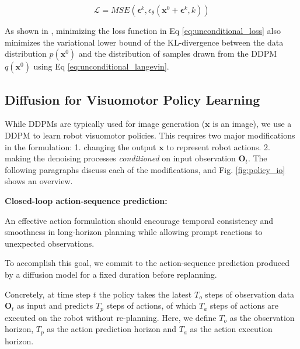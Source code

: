 \vspace{-2mm}
\begin{equation}
    \mathcal{L} = MSE(\mathbf{\epsilon}^k, \epsilon_\theta(\mathbf{x}^0+\mathbf{\epsilon}^k,k))
    \label{eq:unconditional_loss}
\end{equation}

As shown in \cite{ho2020denoising}, minimizing the loss function in Eq \ref{eq:unconditional_loss} also minimizes the variational lower bound of the KL-divergence between the data distribution $p(\mathbf{x}^0)$ and the distribution of samples drawn from the DDPM $q(\mathbf{x}^0)$ using Eq \ref{eq:unconditional_langevin}.






























\subsection{Diffusion for Visuomotor Policy Learning} 

While DDPMs are typically used for image generation ($\mathbf{x}$ is an image), we use a DDPM to learn robot visuomotor policies. This requires two major modifications in the formulation: 
1. changing the output $\mathbf{x}$  to represent robot actions.  
2. making the denoising processes \textit{conditioned} on input observation $\mathbf{O}_t$. 
The following paragraphs discuss each of the modifications, and Fig. \ref{fig:policy_io} shows an overview. 

\textbf{Closed-loop action-sequence prediction:}

An effective action formulation should encourage temporal consistency and smoothness in long-horizon planning while allowing prompt reactions to unexpected observations. 


To accomplish this goal, we commit to the action-sequence prediction produced by a diffusion model for a fixed duration before replanning. 

Concretely, at time step $t$ the policy takes the latest $T_o$ steps of observation data $\mathbf{O}_t$ as input and predicts $T_p$ steps of actions, of which $T_a$ steps of actions are executed on the robot without re-planning. Here, we define $T_o$ as the observation horizon, $T_p$ as the action prediction horizon and $T_a$ as the action execution horizon. 




